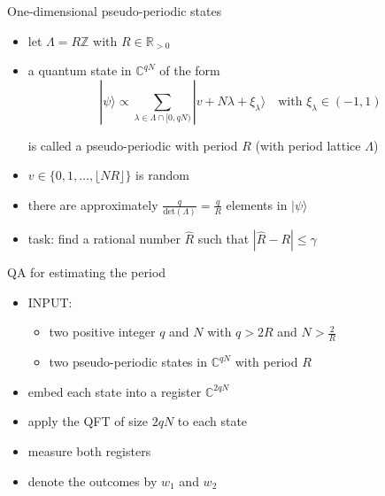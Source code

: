 \documentclass[slideColor]{prosper}
\newcommand{\C}{\mathbb C}
\renewcommand{\>}{\rangle}
\newcommand{\<}{\langle}
\begin{document}

\begin{slide}{One-dimensional pseudo-periodic states}

\begin{itemize}
\item let $\Lambda=R \mathbb{Z}$ with $R\in\mathbb{R}_{>0}$

\medskip
\item a quantum state in $\C^{qN}$ of the form
\[
|\psi\> \propto \sum_{\lambda\in\Lambda\cap [0,qN)} | v + N \lambda + \xi_\lambda \> \quad\mbox{with $\xi_\lambda\in (-1,1)$}
\]

is called a pseudo-periodic with period $R$ (with period lattice $\Lambda$)

\medskip
\item $v\in\{0,1,\ldots,\lfloor N R \rfloor\}$ is random

\medskip
\item there are approximately $\tfrac{q}{\mathrm{det}(\Lambda)} = \tfrac{q}{R}$ elements in $|\psi\>$

\medskip
\item task: find a rational number $\hat{R}$ such that $|\hat{R}-R|\le \gamma$
\end{itemize}

\end{slide}


\begin{slide}{QA for estimating the period}

\begin{itemize}

\item INPUT:

\begin{itemize}
\item two positive integer $q$ and $N$ with $q > 2 R$ and $N > \tfrac{2}{R}$

\medskip
\item two pseudo-periodic states in $\mathbb{C}^{qN}$ with period $R$
\end{itemize}

\medskip
\item embed each state into a register $\mathbb{C}^{2qN}$

\medskip
\item apply the QFT of size $2qN$ to each state

\medskip
\item measure both registers

\medskip
\item denote the outcomes by $w_1$ and $w_2$

\end{itemize}
\end{slide}
\end{document}
